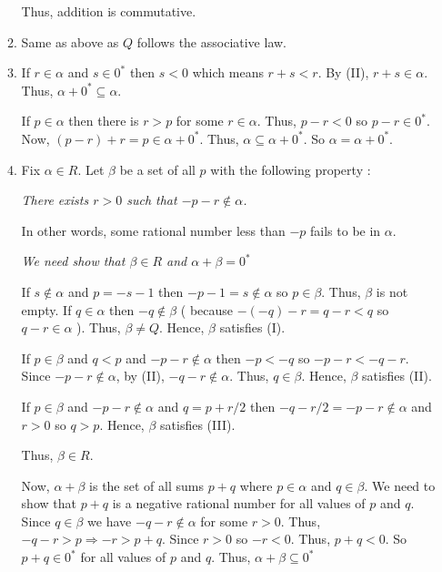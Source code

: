 \begin{enumerate}[{\bf Step 1.}]
\begin{enumerate}[(\text{A}1)]
    Thus, addition is commutative.

    \item Same as above as $Q$ follows the associative law.
    
    \item If $r \in \alpha$ and $s \in 0^*$ then $s < 0$ which means $r + s < r$.
    By (II), $r + s \in \alpha$. Thus, $\alpha + 0^* \subseteq \alpha$.

    If $p \in \alpha$ then there is $r > p$ for some $r \in \alpha$.
    Thus, $p - r < 0$ so $p - r \in 0^*$. Now, $(p - r) + r = p \in \alpha + 0^*$.
    Thus, $\alpha \subseteq \alpha + 0^*$. So $\alpha = \alpha + 0^*$.

    \item Fix $\alpha \in R$. Let $\beta$ be a set of all $p$ with the following property : 
    
    {\it There exists $r > 0$ such that $- p - r \notin \alpha$.}

    In other words, some rational number less than $- p$ fails to be in $\alpha$.
    
    {\it We need show that $\beta \in R$ and $\alpha + \beta = 0^*$ }

    If $s \notin \alpha$ and $p = - s - 1$ then $- p - 1 = s \notin \alpha$ so $p \in \beta$. Thus, $\beta$ is not empty.
    If $q \in \alpha$ then $-q \notin \beta$ ( because $-(-q) - r = q - r < q$ so $q-r \in \alpha$ ). Thus, $\beta \neq Q$. 
    Hence, $\beta$ satisfies (I).

    If $p \in \beta$ and $q < p$ and $ - p - r \notin \alpha$ then $ -p < -q $ so $ - p - r < - q - r $. 
    Since $ - p - r \notin \alpha$, by (II), $ - q - r \notin \alpha $. Thus, $q \in\beta$. Hence, $\beta$ satisfies (II).

    If $p \in \beta$ and $ - p - r \notin \alpha$ and $q = p + r/2$ then $ - q - r/2 = - p - r \notin \alpha$ and $r > 0$ so $q > p$.
    Hence, $\beta$ satisfies (III).

    Thus, $\beta \in R$.

    Now, $\alpha + \beta$ is the set of all sums $p + q$ where $p \in \alpha$ and $q \in \beta$. 
    We need to show that $p + q$ is a negative rational number for all values of $p$ and $q$.
    Since $q \in \beta$ we have $ - q - r \notin \alpha$ for some $r > 0$. 
    Thus, $ - q - r > p  \Rightarrow - r > p + q $.
    Since $r > 0$ so $- r < 0$. Thus, $p + q < 0$. So $p + q \in 0^*$ for all values of $p$ and $q$.
    Thus, $\alpha + \beta \subseteq 0^*$


\end{enumerate}
\end{enumerate}
